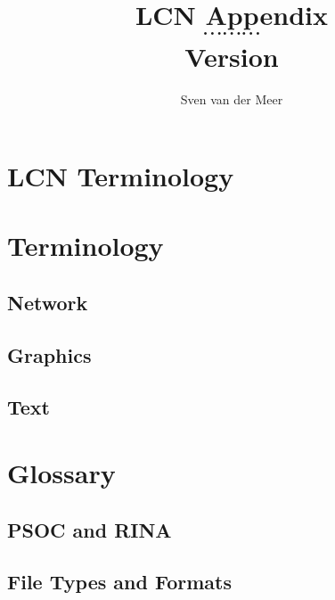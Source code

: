 \documentclass[a4paper,final,notitlepage,makeindex]{article}
\begin{document}
    \renewcommand*{\bibfont}{\citefont}
    \newcommand{\lcncite}[1]{{\citefont\cite{#1}}}

    \author{Sven van der Meer}
    \title{LCN Appendix \\ $\cdots \cdots \cdots$ \\ \small{Version }}
    \maketitle

    

    \begin{multicols}{2}
        \setcounter{tocdepth}{3}
        \tableofcontents
    \end{multicols}
    \newpage

    \section{LCN Terminology}
        

    \section{Terminology}
        \subsection{Network}
            
        \subsection{Graphics}
            
        \subsection{Text}
            

    \section{Glossary}
        \subsection{PSOC and RINA}
            

        \subsection{File Types and Formats}
            
\end{document}
